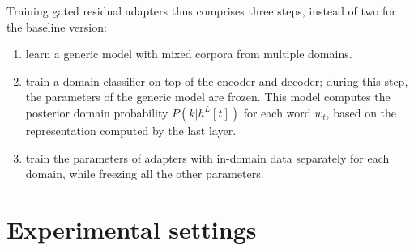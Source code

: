 Training gated residual adapters thus comprises three steps, instead of two for the baseline version:
\begin{enumerate}
\item learn a generic model with mixed corpora from multiple domains.
\item train a domain classifier on top of the encoder and decoder; during this step, the parameters of the generic model are frozen. This model computes the posterior domain probability $P(k|h^L[t])$ for each word $w_t$, based on the representation computed by the last layer.
\item train the parameters of adapters with in-domain data separately for each domain, while freezing all the other parameters.
\end{enumerate}

\section{Experimental settings \label{sec:exp-chap6}}

